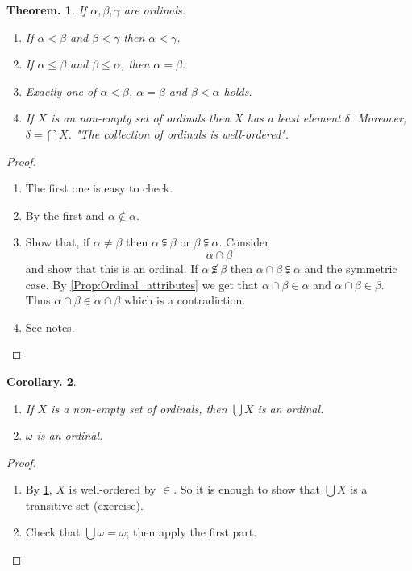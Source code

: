 \documentclass[a4paper,oneside,11pt,DIV=12,parskip=half]{scrartcl}
\theoremstyle{plain}
\newtheorem{theorem}{Theorem.}[section]
\newtheorem{corollary}[theorem]{Corollary.}
\theoremstyle{definition}
\newtheorem{remark, definition}[theorem]{Remark and Definition.}
\newtheorem{lemma, definition}[theorem]{Lemma and Definition.}
\newtheorem{theorem, definition}[theorem]{Theorem and Definition.}
\theoremstyle{remark}
\newtheorem*{remark, example}{\textbf{Remark and Exercise}}
\begin{document}
\begin{theorem}\label{Th:ordinal_ordering}
If $\alpha,\beta,\gamma$ are ordinals.
\begin{enumerate}
    \item If $\alpha < \beta $ and $\beta < \gamma$ then $\alpha < \gamma$.
    \item If $\alpha \leq \beta$ and $\beta \leq \alpha$, then $\alpha = \beta$.
    \item Exactly one of $\alpha < \beta$, $\alpha = \beta$ and $\beta < \alpha$ holds.
    \item If $X$ is an non-empty set of ordinals then $X$ has a least element $\delta$.
    Moreover, $\delta = \bigcap X$. "The collection of ordinals is well-ordered".
\end{enumerate}
\end{theorem}
\begin{proof}
\begin{enumerate}
    \item The first one is easy to check.
    \item By the first and $\alpha \not \in \alpha$.
    \item Show that, if $\alpha \neq \beta$ then $\alpha \subsetneqq \beta$ or $\beta \subsetneqq \alpha$. Consider
    \[ \alpha \cap \beta \]
    and show that this is an ordinal. If $\alpha \not \subsetneqq \beta$ then $\alpha \cap \beta \subsetneqq \alpha$ and the symmetric case. By \ref{Prop:Ordinal_attributes} we get that $\alpha \cap \beta \in \alpha$ and $\alpha \cap \beta \in \beta$. Thus $\alpha \cap \beta \in \alpha \cap \beta$ which is a contradiction.
    \item See notes.
\end{enumerate}
\end{proof}

\begin{corollary}
\begin{enumerate}
    \item If $X$ is a non-empty set of ordinals, then $\bigcup X$ is an ordinal.
    \item $\omega$ is an ordinal.
\end{enumerate}
\end{corollary}

\begin{proof}
\begin{enumerate}
    \item By \ref{Th:ordinal_ordering}, $X$ is well-ordered by $\in$. So it is enough to show that $\bigcup X$ is a transitive set (exercise).
    \item Check that $\bigcup \omega = \omega$; then apply the first part.
\end{enumerate}
\end{proof}
\end{document}
